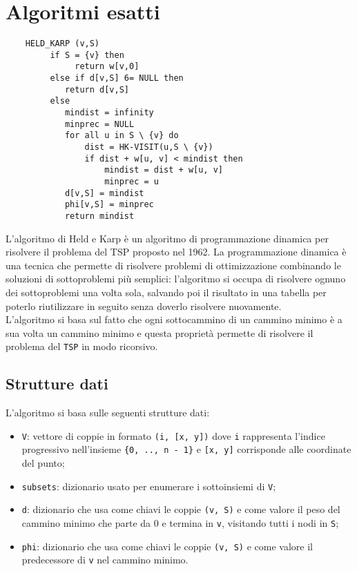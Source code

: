 \section{Algoritmi esatti}\label{prim}
\begin{lstlisting}
	HELD_KARP (v,S)
		 if S = {v} then
		 	  return w[v,0]   
		 else if d[v,S] 6= NULL then
		 	return d[v,S]
		 else
		 	mindist = infinity
		 	minprec = NULL
		 	for all u in S \ {v} do 
		 		dist = HK-VISIT(u,S \ {v})
		 		if dist + w[u, v] < mindist then
		 			mindist = dist + w[u, v]
		 			minprec = u
		 	d[v,S] = mindist
		 	phi[v,S] = minprec  
		 	return mindist                      
\end{lstlisting}

L’algoritmo di Held e Karp è un algoritmo di programmazione dinamica per risolvere il problema del TSP proposto nel 1962. La programmazione dinamica è una tecnica che permette di risolvere problemi di ottimizzazione
combinando le soluzioni di sottoproblemi più semplici: l'algoritmo si occupa di risolvere ognuno dei sottoproblemi una volta sola, salvando poi il risultato in una tabella per poterlo riutilizzare in seguito senza doverlo risolvere nuovamente. \\
L'algoritmo si basa sul fatto che ogni sottocammino di un cammino minimo è a sua volta un cammino minimo e questa proprietà permette di risolvere il problema del \texttt{TSP} in modo ricorsivo.

\subsection{Strutture dati}
L'algoritmo si basa sulle seguenti strutture dati:
\begin{itemize}
	\item \texttt{V}: vettore di coppie in formato \texttt{(i, [x, y])} dove \texttt{i} rappresenta l'indice progressivo nell'insieme \texttt{\{0, .., n - 1\}} e \texttt{[x, y]} corrisponde alle coordinate del punto;
	\item \texttt{subsets}: dizionario usato per enumerare i sottoinsiemi di \texttt{V};
	\item \texttt{d}: dizionario che usa come chiavi le coppie \texttt{(v, S)} e come valore il peso del cammino minimo che parte da 0 e termina in \texttt{v}, visitando tutti i nodi in \texttt{S};
	\item \texttt{phi}: dizionario che usa come chiavi le coppie \texttt{(v, S)} e come valore il predecessore di \texttt{v} nel cammino minimo.
\end{itemize}



